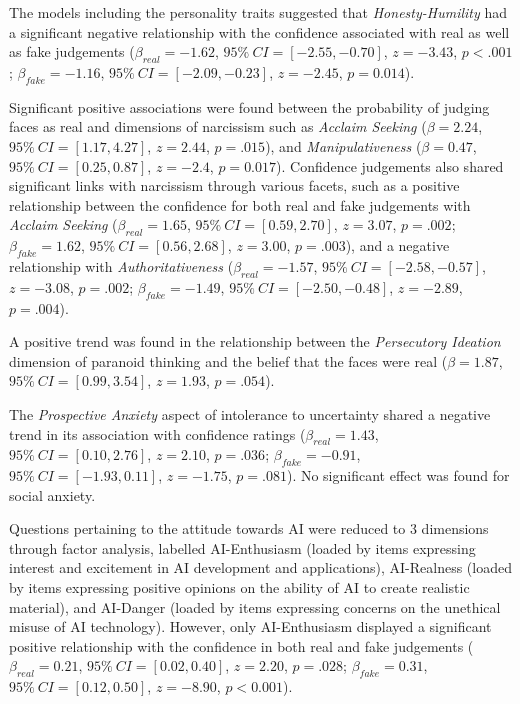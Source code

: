 \documentclass[
  man,floatsintext]{apa6}
\begin{document}
The models including the personality traits suggested that \emph{Honesty-Humility} had a significant negative relationship with the confidence associated with real as well as fake judgements (\(\beta_{real} = -1.62\), \(95\%~CI = [-2.55, -0.70]\), \(z = -3.43\), \(p < .001\); \(\beta_{fake} = -1.16\), \(95\%~CI = [-2.09, -0.23]\), \(z = -2.45\), \(p = 0.014\)).

Significant positive associations were found between the probability of judging faces as real and dimensions of narcissism such as \emph{Acclaim Seeking} (\(\beta = 2.24\), \(95\%~CI = [1.17, 4.27]\), \(z = 2.44\), \(p = .015\)), and \emph{Manipulativeness} (\(\beta = 0.47\), \(95\%~CI = [0.25, 0.87]\), \(z = -2.4\), \(p = 0.017\)). Confidence judgements also shared significant links with narcissism through various facets, such as a positive relationship between the confidence for both real and fake judgements with \emph{Acclaim Seeking} (\(\beta_{real} = 1.65\), \(95\%~CI = [0.59, 2.70]\), \(z = 3.07\), \(p =.002\); \(\beta_{fake} = 1.62\), \(95\%~CI = [0.56, 2.68]\), \(z = 3.00\), \(p = .003\)), and a negative relationship with \emph{Authoritativeness} (\(\beta_{real} = -1.57\), \(95\%~CI = [-2.58, -0.57]\), \(z = -3.08\), \(p = .002\); \(\beta_{fake} = -1.49\), \(95\%~CI = [-2.50, -0.48]\), \(z = -2.89\), \(p = .004\)).

A positive trend was found in the relationship between the \emph{Persecutory Ideation} dimension of paranoid thinking and the belief that the faces were real (\(\beta = 1.87\), \(95\%~CI = [0.99, 3.54]\), \(z = 1.93\), \(p = .054\)).

The \emph{Prospective Anxiety} aspect of intolerance to uncertainty shared a negative trend in its association with confidence ratings (\(\beta_{real} = 1.43\), \(95\%~CI = [0.10, 2.76]\), \(z = 2.10\), \(p = .036\); \(\beta_{fake} = -0.91\), \(95\%~CI = [-1.93, 0.11]\), \(z = -1.75\), \(p = .081\)). No significant effect was found for social anxiety.

Questions pertaining to the attitude towards AI were reduced to 3 dimensions through factor analysis, labelled AI-Enthusiasm (loaded by items expressing interest and excitement in AI development and applications), AI-Realness (loaded by items expressing positive opinions on the ability of AI to create realistic material), and AI-Danger (loaded by items expressing concerns on the unethical misuse of AI technology). However, only AI-Enthusiasm displayed a significant positive relationship with the confidence in both real and fake judgements (\(\beta_{real} = 0.21\), \(95\%~CI = [0.02, 0.40]\), \(z = 2.20\), \(p = .028\); \(\beta_{fake} = 0.31\), \(95\%~CI = [0.12, 0.50]\), \(z = -8.90\), \(p < 0.001\)).
\end{document}
